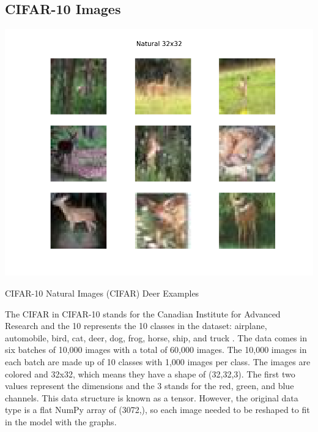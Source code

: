 \documentclass[12pt]{article}
\begin{document}
        \subsection{CIFAR-10 Images}
        
            \begin{table}[h]
            
                \begin{center}

                    \includegraphics[scale=0.6]{natural_overview.png}
                    \caption{CIFAR-10 Natural Images (CIFAR) Deer Examples \cite{krizhevsky2009}}
                    \label{cifar-overview}
        
                \end{center}
                
            \end{table}

            The CIFAR in CIFAR-10 stands for the Canadian Institute for Advanced Research and the 10 represents the 10 classes in the dataset: 
            airplane, automobile, bird, cat, deer, dog, frog, horse, ship, and truck \cite{krizhevsky2009}. 
            The data comes in six batches of 10,000 images with a total of 60,000 images. 
            The 10,000 images in each batch are made up of 10 classes with 1,000 images per class. 
            The images are colored and 32x32, which means they have a shape of (32,32,3). 
            The first two values represent the dimensions and the 3 stands for the red, green, and blue channels. 
            This data structure is known as a tensor. However, the original data type is a flat NumPy array of (3072,), 
            so each image needed to be reshaped to fit in the model with the graphs.
            
\end{document}
